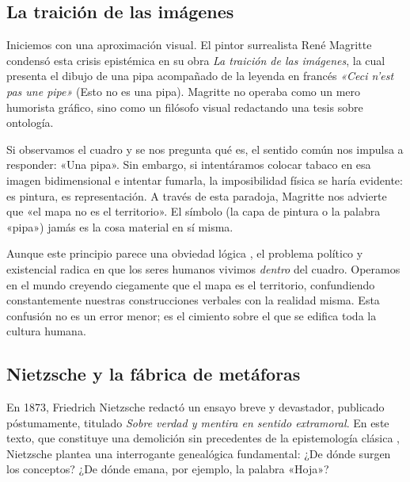 \subsection{La traición de las imágenes}

Iniciemos con una aproximación visual. El pintor surrealista René Magritte condensó esta crisis epistémica en su obra \textit{La traición de las imágenes}, la cual presenta el dibujo de una pipa acompañado de la leyenda en francés \textit{«Ceci n'est pas une pipe»} (Esto no es una pipa). Magritte no operaba como un mero humorista gráfico, sino como un filósofo visual redactando una tesis sobre ontología. 

Si observamos el cuadro y se nos pregunta qué es, el sentido común nos impulsa a responder: «Una pipa». Sin embargo, si intentáramos colocar tabaco en esa imagen bidimensional e intentar fumarla, la imposibilidad física se haría evidente: es pintura, es representación. A través de esta paradoja, Magritte nos advierte que «el mapa no es el territorio». El símbolo (la capa de pintura o la palabra «pipa») jamás es la cosa material en sí misma. 

Aunque este principio parece una obviedad lógica , el problema político y existencial radica en que los seres humanos vivimos \textit{dentro} del cuadro. Operamos en el mundo creyendo ciegamente que el mapa es el territorio, confundiendo constantemente nuestras construcciones verbales con la realidad misma. Esta confusión no es un error menor; es el cimiento sobre el que se edifica toda la cultura humana.

\subsection{Nietzsche y la fábrica de metáforas}

En 1873, Friedrich Nietzsche redactó un ensayo breve y devastador, publicado póstumamente, titulado \textit{Sobre verdad y mentira en sentido extramoral}. En este texto, que constituye una demolición sin precedentes de la epistemología clásica , Nietzsche plantea una interrogante genealógica fundamental: ¿De dónde surgen los conceptos?  ¿De dónde emana, por ejemplo, la palabra «Hoja»? 

